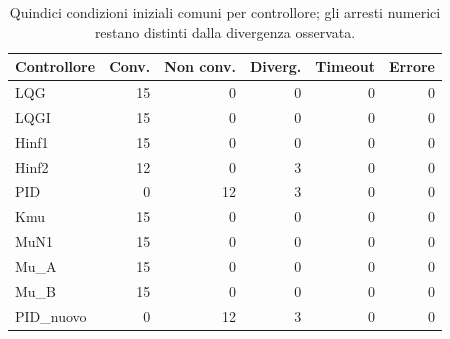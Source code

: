 \par
\begin{table}[htbp]\centering\small
\setlength{\tabcolsep}{4pt}
\begin{tabular}{lrrrrr}\toprule
Controllore & Conv. & Non conv. & Diverg. & Timeout & Errore\\\midrule
LQG & 15 & 0 & 0 & 0 & 0\\
LQGI & 15 & 0 & 0 & 0 & 0\\
Hinf1 & 15 & 0 & 0 & 0 & 0\\
Hinf2 & 12 & 0 & 3 & 0 & 0\\
PID & 0 & 12 & 3 & 0 & 0\\
Kmu & 15 & 0 & 0 & 0 & 0\\
MuN1 & 15 & 0 & 0 & 0 & 0\\
Mu\_A & 15 & 0 & 0 & 0 & 0\\
Mu\_B & 15 & 0 & 0 & 0 & 0\\
PID\_nuovo & 0 & 12 & 3 & 0 & 0\\
\bottomrule\end{tabular}
\caption{Quindici condizioni iniziali comuni per controllore; gli arresti numerici restano distinti dalla divergenza osservata.}
\end{table}
\par
